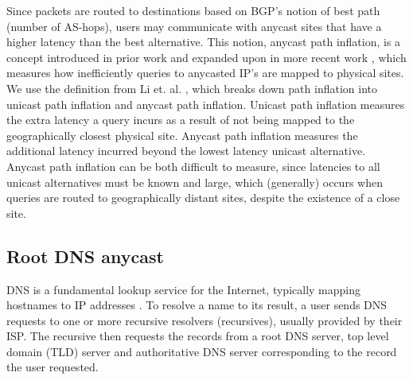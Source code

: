 \documentclass[sigconf,letterpaper,nonacm,10pt,anonymous]{acmart}
\begin{document}
Since packets are routed to destinations based on BGP's notion of best
path (number of AS-hops), users may communicate with anycast sites that
have a higher latency than the best alternative. This notion, anycast
path inflation, is a concept introduced in prior work
\cite{de2017anycast} and expanded upon in more recent work
\cite{li_levin_spring_bhattacharjee_2018}, which measures how
inefficiently queries to anycasted IP's are mapped to physical sites. We
use the definition from Li et. al.
\cite{li_levin_spring_bhattacharjee_2018}, which breaks down path
inflation into unicast path inflation and anycast path inflation.
Unicast path inflation measures the extra latency a query incurs as a
result of not being mapped to the geographically closest physical site.
Anycast path inflation measures the additional latency incurred beyond
the lowest latency unicast alternative. Anycast path inflation can be
both difficult to measure, since latencies to all unicast alternatives
must be known and large, which (generally) occurs when queries are
routed to geographically distant sites, despite the existence of a close
site.

\subsection{Root DNS anycast}\label{root-dns-anycast-1}

\label{sec:bg_root_dns_anycast}

DNS is a fundamental lookup service for the Internet, typically mapping
hostnames to IP addresses \cite{cloudflare_dns_tutorial, rfc_1035}. To
resolve a name to its result, a user sends DNS requests to one or more
recursive resolvers (recursives), usually provided by their ISP. The
recursive then requests the records from a root DNS server, top level
domain (TLD) server and authoritative DNS server corresponding to the
record the user requested.
\end{document}

